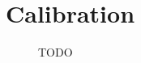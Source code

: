 \section{Calibration}

\begin{figure}[ht]
    \centering
    \caption{TODO}
    \label{fig:real_calibration_setup}
\end{figure}
